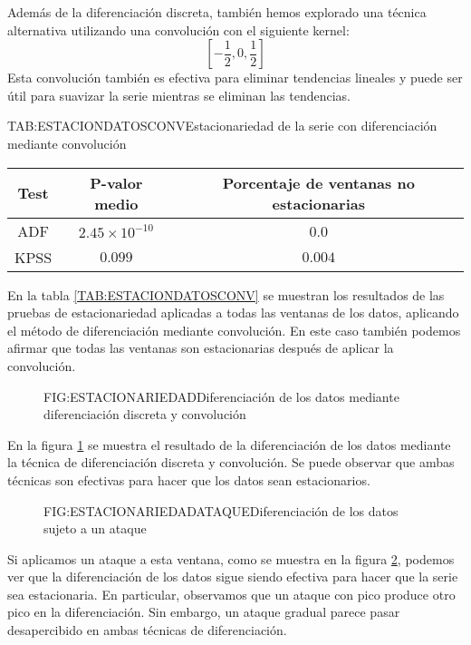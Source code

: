 Además de la diferenciación discreta, también hemos explorado una técnica alternativa utilizando una convolución con el siguiente kernel:
\[
[-\frac{1}{2}, 0, \frac{1}{2}]
\]
Esta convolución también es efectiva para eliminar tendencias lineales y puede ser útil para suavizar la serie mientras se eliminan las tendencias.

\begin{table}[Estacionariedad de la serie con diferenciación mediante convolución]{TAB:ESTACIONDATOSCONV}{Estacionariedad de la serie con diferenciación mediante convolución}
    \begin{tabular}{|c|c|c|}
        \hline
        \textbf{Test} & \textbf{P-valor medio} & \textbf{Porcentaje de ventanas no estacionarias} \\
        \hline
        ADF & $2.45\times 10^{-10}$ & 0.0 \\
        KPSS & $0.099$ & $0.004$ \\
        \hline
    \end{tabular}
\end{table}

En la tabla \ref{TAB:ESTACIONDATOSCONV} se muestran los resultados de las pruebas de estacionariedad aplicadas a todas las ventanas de los datos, aplicando el método de diferenciación mediante convolución. En este caso también podemos afirmar que todas las ventanas son estacionarias después de aplicar la convolución.

\begin{figure}[Diferenciación de los datos mediante diferenciación discreta y convolución]{FIG:ESTACIONARIEDAD}{Diferenciación de los datos mediante diferenciación discreta y convolución}
    \label{FIG:ESTACIONARIEDAD}
\end{figure}

En la figura \ref{FIG:ESTACIONARIEDAD} se muestra el resultado de la diferenciación de los datos mediante la técnica de diferenciación discreta y convolución. Se puede observar que ambas técnicas son efectivas para hacer que los datos sean estacionarios.

\begin{figure}[Diferenciación de los datos sujeto a un ataque]{FIG:ESTACIONARIEDADATAQUE}{Diferenciación de los datos sujeto a un ataque}
    \label{FIG:ESTACIONARIEDADATAQUE}
\end{figure}

Si aplicamos un ataque a esta ventana, como se muestra en la figura \ref{FIG:ESTACIONARIEDADATAQUE}, podemos ver que la diferenciación de los datos sigue siendo efectiva para hacer que la serie sea estacionaria. En particular, observamos que un ataque con pico produce otro pico en la diferenciación. Sin embargo, un ataque gradual parece pasar desapercibido en ambas técnicas de diferenciación.

